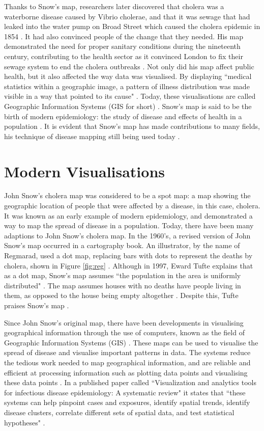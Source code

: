 \documentclass[12pt]{article}
\begin{document}
Thanks to Snow's map, researchers later discovered that cholera was a waterborne disease caused by Vibrio cholerae, and that it was sewage that had leaked into the water pump on Broad Street which caused the cholera epidemic in 1854 \cite{channel1}. It had also convinced people of the change that they needed. His map demonstrated the need for proper sanitary conditions during the nineteenth century, contributing to the health sector as it convinced London to fix their sewage system to end the cholera outbreaks \cite{top5}. Not only did his map affect public health, but it also affected the way data was visualised. By displaying ``medical statistics within a geographic image, a pattern of illness distribution was made visible in a way that pointed to its cause" \cite{test}. Today, these visualisations are called Geographic Information Systems (GIS for short) \cite{test}. Snow's map is said to be the birth of modern epidemiology: the study of disease and effects of health in a population \cite{youtube}. It is evident that Snow's map has made contributions to many fields, his technique of disease mapping still being used today \cite{channel1}. 

\section{Modern Visualisations}

John Snow's cholera map was considered to be a spot map: a map showing the geographic location of people that were affected by a disease, in this case, cholera. It was known as an early example of modern epidemiology, and demonstrated a way to map the spread of disease in a population. Today, there have been many adaptions to John Snow's cholera map. In the 1960's, a revised version of John Snow's map occurred in a cartography book. An illustrator, by the name of Regmarad, used a dot map, replacing bars with dots to represent the deaths by cholera, shown in Figure \ref{fig:reg}  \cite{ralph}. Although in 1997, Eward Tufte explains that as a dot map, Snow's map assumes ``the population in the area is uniformly distributed" \cite{blog}. The map assumes houses with no deaths have people living in them, as opposed to the house being empty altogether \cite{blog}. Despite this, Tufte praises Snow's map \cite{blog}.  

Since John Snow's original map, there have been developments in visualising geographical information through the use of computers, known as the field of Geographic Information Systems (GIS) \cite{howe1970some}. These maps can be used to visualise the spread of disease and visualise important patterns in data. The systems reduce the tedious work needed to map geographical information, and are reliable and efficient at processing information such as plotting data points and visualising these data points \cite{howe1970some}. In a published paper called ``Visualization and analytics tools for infectious disease epidemiology: A systematic review" it states that  ``these systems can help pinpoint cases and exposures, identify spatial trends, identify disease clusters, correlate different sets of spatial data, and test statistical hypotheses" \cite{recent}. 
\end{document}
